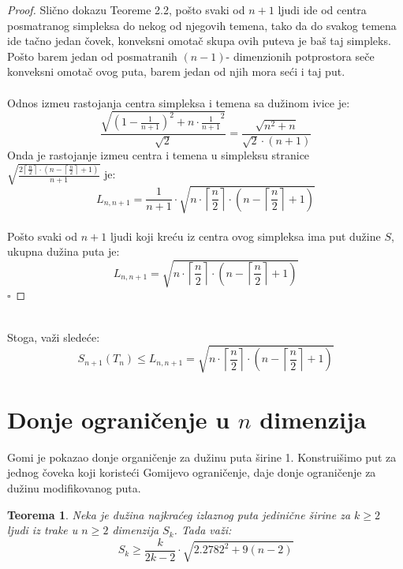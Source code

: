 \documentclass[11pt,letter]{article}
\newtheorem{teo}{\bf Teorema}[section]
\newcommand{\qed}{\hfill $\square$ \bigskip}
\begin{document}
\begin{proof}
Sli\v cno dokazu Teoreme 2.2, po\v sto svaki od $n+1$ ljudi ide od centra posmatranog simpleksa do nekog od njegovih temena, tako da do svakog temena ide ta\v cno jedan \v covek, konveksni omota\v c skupa ovih puteva je ba\v s taj simpleks. Po\v sto barem jedan od posmatranih $(n-1)$- dimenzionih potprostora se\v ce konveksni omota\v c ovog puta, barem jedan od njih mora se\' ci i taj put. 
\\
\\
\indent Odnos izme\dj u rastojanja centra simpleksa i temena sa du\v zinom ivice je:
$$\frac{\sqrt{\left( 1-\frac{1}{n+1}\right)^2+n\cdot{\frac{1}{n+1}}^2}}{\sqrt2}=\frac{\sqrt{n^2+n}}{\sqrt2 \cdot(n+1)}$$
\indent Onda je rastojanje izme\dj u centra i temena u simpleksu stranice  $\sqrt{\frac{2\left\lceil \frac{n}{2}\right\rceil\cdot \left( n-\left\lceil\frac{n}{2}\right\rceil+1\right)}{n+1}}$ je:
\\
$$L_{n,n+1}=\frac{1}{n+1}\cdot\sqrt{n\cdot\left\lceil\frac{n}{2}\right\rceil\cdot\left( n-\left\lceil\frac{n}{2}\right\rceil+1\right)}$$
\\
\indent Po\v sto svaki od $n+1$ ljudi koji kre\' cu iz centra ovog simpleksa ima put du\v zine $S$, ukupna du\v zina puta je:
\\
$$L_{n,n+1}=\sqrt{n\cdot\left\lceil\frac{n}{2}\right\rceil\cdot\left( n-\left\lceil\frac{n}{2}\right\rceil +1\right)}$$
\qed
\end{proof}
\\
\indent Stoga, va\v zi slede\' ce:
$$S_{n+1}(T_n)\leqslant L_{n,n+1}= \sqrt{n\cdot\left\lceil\frac{n}{2}\right\rceil\cdot\left( n-\left\lceil\frac{n}{2}\right\rceil +1\right)}$$


\section{Donje ograni\v cenje u $n$ dimenzija}
\bigskip
Gomi \cite{Ghomi} je pokazao donje organi\v cenje za du\v zinu puta \v sirine 1. Konstrui\v simo put za jednog \v coveka koji koriste\' ci Gomijevo ograni\v cenje, daje donje ograni\v cenje za du\v zinu modifikovanog puta.

\begin{teo}
Neka je du\v zina najkra\' ceg izlaznog puta jedini\v cne \v sirine za $k\geqslant 2$ ljudi iz trake u $n\geqslant 2$ dimenzija $S_k$. Tada va\v zi:
$$S_k\geqslant\frac{k}{2k-2}\cdot \sqrt{2.2782^2+9(n-2)}$$
\end{teo}
\end{document}
